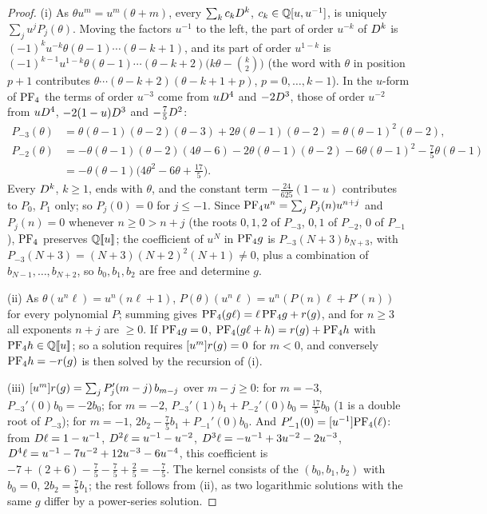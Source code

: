 \begin{proof}
(i) As $\theta u^m=u^m(\theta+m)$, every $\sum_kc_kD^k$, $c_k\in\mathbb{Q}[u,u^{-1}]$, is uniquely $\sum_ju^jP_j(\theta)$. Moving the factors $u^{-1}$ to the left, the part of order $u^{-k}$ of $D^k$ is $(-1)^ku^{-k}\theta(\theta-1)\cdots(\theta-k+1)$, and its part of order $u^{1-k}$ is $(-1)^{k-1}u^{1-k}\theta(\theta-1)\cdots(\theta-k+2)\bigl(k\theta-\binom k2\bigr)$ (the word with $\theta$ in position $p+1$ contributes $\theta\cdots(\theta-k+2)(\theta-k+1+p)$, $p=0,\dots,k-1$). In the $u$-form of $\mathrm{PF}_{4}$ the terms of order $u^{-3}$ come from $uD^4$ and $-2D^3$, those of order $u^{-2}$ from $uD^4$, $-2(1-u)D^3$ and $-\frac75D^2$:
\begin{align*}
P_{-3}(\theta)&=\theta(\theta-1)(\theta-2)(\theta-3)+2\theta(\theta-1)(\theta-2)=\theta(\theta-1)^2(\theta-2),\\
P_{-2}(\theta)&=-\theta(\theta-1)(\theta-2)(4\theta-6)-2\theta(\theta-1)(\theta-2)-6\theta(\theta-1)^2-\tfrac75\theta(\theta-1)\\
&=-\theta(\theta-1)\bigl(4\theta^2-6\theta+\tfrac{17}5\bigr).
\end{align*}
Every $D^k$, $k\geq1$, ends with $\theta$, and the constant term $-\frac{24}{625}(1-u)$ contributes to $P_0$, $P_1$ only; so $P_j(0)=0$ for $j\leq-1$. Since $\mathrm{PF}_{4} u^n=\sum_jP_j(n)u^{n+j}$ and $P_j(n)=0$ whenever $n\geq0>n+j$ (the roots $0,1,2$ of $P_{-3}$, $0,1$ of $P_{-2}$, $0$ of $P_{-1}$), $\mathrm{PF}_{4}$ preserves $\mathbb{Q}[\![ u ]\!]$; the coefficient of $u^N$ in $\mathrm{PF}_{4} g$ is $P_{-3}(N+3)b_{N+3}$, with $P_{-3}(N+3)=(N+3)(N+2)^2(N+1)\neq0$, plus a combination of $b_{N-1},\dots,b_{N+2}$, so $b_0,b_1,b_2$ are free and determine $g$.

(ii) As $\theta(u^n\ell)=u^n(n\ell+1)$, $P(\theta)(u^n\ell)=u^n(P(n)\ell+P'(n))$ for every polynomial $P$; summing gives $\mathrm{PF}_{4}(g\ell)=\ell\,\mathrm{PF}_{4} g+r(g)$, and for $n\geq3$ all exponents $n+j$ are $\geq0$. If $\mathrm{PF}_{4} g=0$, $\mathrm{PF}_{4}(g\ell+h)=r(g)+\mathrm{PF}_{4} h$ with $\mathrm{PF}_{4} h\in\mathbb{Q}[\![ u ]\!]$; so a solution requires $[u^m]r(g)=0$ for $m<0$, and conversely $\mathrm{PF}_{4} h=-r(g)$ is then solved by the recursion of (i).

(iii) $[u^m]r(g)=\sum_jP_j'(m-j)\,b_{m-j}$ over $m-j\geq0$: for $m=-3$, $P_{-3}'(0)b_0=-2b_0$; for $m=-2$, $P_{-3}'(1)b_1+P_{-2}'(0)b_0=\frac{17}5b_0$ ($1$ is a double root of $P_{-3}$); for $m=-1$, $2b_2-\frac75b_1+P_{-1}'(0)b_0$. And $P_{-1}'(0)=[u^{-1}]\mathrm{PF}_{4}(\ell)$: from $D\ell=1-u^{-1}$, $D^2\ell=u^{-1}-u^{-2}$, $D^3\ell=-u^{-1}+3u^{-2}-2u^{-3}$, $D^4\ell=u^{-1}-7u^{-2}+12u^{-3}-6u^{-4}$, this coefficient is $-7+(2+6)-\frac75-\frac75+\frac25=-\frac75$. The kernel consists of the $(b_0,b_1,b_2)$ with $b_0=0$, $2b_2=\frac75b_1$; the rest follows from (ii), as two logarithmic solutions with the same $g$ differ by a power-series solution.
\end{proof}


